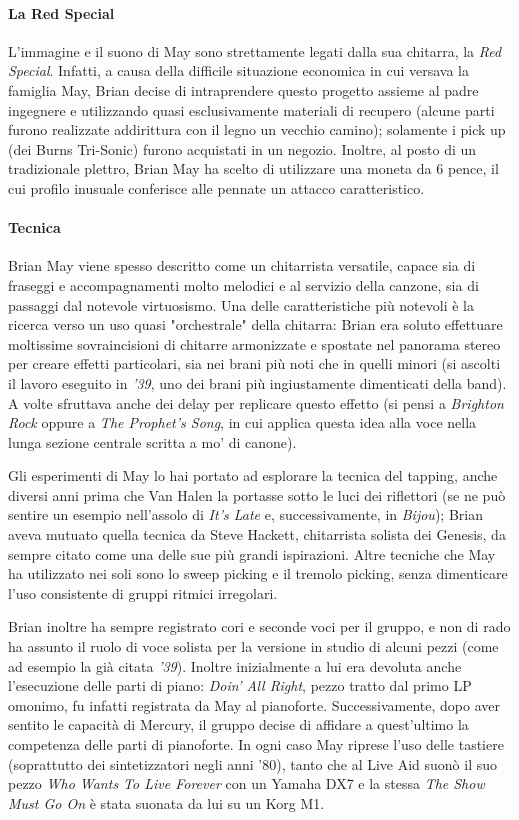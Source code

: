 \documentclass[12pt]{article}
\begin{document}
\paragraph{La Red Special}
L'immagine e il suono di May sono strettamente legati dalla sua chitarra, la \emph{Red Special}. Infatti, a causa della difficile situazione economica in cui versava la famiglia May, Brian decise di intraprendere questo progetto assieme al padre ingegnere e utilizzando quasi esclusivamente materiali di recupero (alcune parti furono realizzate addirittura con il legno un vecchio camino); solamente i pick up (dei Burns Tri-Sonic) furono acquistati in un negozio. Inoltre, al posto di un tradizionale plettro, Brian May ha scelto di utilizzare una moneta da \(6\) pence, il cui profilo inusuale conferisce alle pennate un attacco caratteristico.

\paragraph{Tecnica}
Brian May viene spesso descritto come un chitarrista versatile, capace sia di fraseggi e accompagnamenti molto melodici e al servizio della canzone, sia di passaggi dal notevole virtuosismo. Una delle caratteristiche più notevoli è la ricerca verso un uso quasi "orchestrale" della chitarra: Brian era soluto effettuare moltissime sovraincisioni di chitarre armonizzate e spostate nel panorama stereo per creare effetti particolari, sia nei brani più noti che in quelli minori (si ascolti il lavoro eseguito in \emph{'39}, uno dei brani più ingiustamente dimenticati della band). A volte sfruttava anche dei delay per replicare questo effetto (si pensi a \emph{Brighton Rock} oppure a \emph{The Prophet's Song}, in cui applica questa idea alla voce nella lunga sezione centrale scritta a mo' di canone).

Gli esperimenti di May lo hai portato ad esplorare la tecnica del tapping, anche diversi anni prima che Van Halen la portasse sotto le luci dei riflettori (se ne può sentire un esempio nell'assolo di \emph{It's Late} e, successivamente, in \emph{Bijou}); Brian aveva mutuato quella tecnica da Steve Hackett, chitarrista solista dei Genesis, da sempre citato come una delle sue più grandi ispirazioni. Altre tecniche che May ha utilizzato nei soli sono lo sweep picking e il tremolo picking, senza dimenticare l'uso consistente di gruppi ritmici irregolari.

Brian inoltre ha sempre registrato cori e seconde voci per il gruppo, e non di rado ha assunto il ruolo di voce solista per la versione in studio di alcuni pezzi (come ad esempio la già citata \emph{'39}). Inoltre inizialmente a lui era devoluta anche l'esecuzione delle parti di piano: \emph{Doin' All Right}, pezzo tratto dal primo LP omonimo, fu infatti registrata da May al pianoforte. Successivamente, dopo aver sentito le capacità di Mercury, il gruppo decise di affidare a quest'ultimo la competenza delle parti di pianoforte. In ogni caso May riprese l'uso delle tastiere (soprattutto dei sintetizzatori negli anni '80), tanto che al Live Aid suonò il suo pezzo \emph{Who Wants To Live Forever} con un Yamaha DX7 e la stessa \emph{The Show Must Go On} è stata suonata da lui su un Korg M1.
\end{document}
